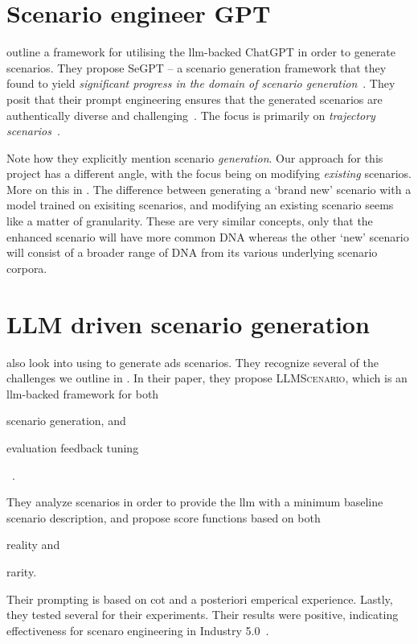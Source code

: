 \section{Scenario engineer GPT}

\citeauthor{seGpt} outline a framework for utilising the \acrshort{llm}-backed ChatGPT in order to
generate scenarios. They propose SeGPT -- a scenario generation framework that they found to yield
\textit{significant progress in the domain of scenario generation}~\cite[4422]{seGpt}. They posit
that their prompt engineering ensures that the generated scenarios are authentically diverse and
challenging~\cite[4423]{seGpt}. The focus is primarily on \textit{trajectory
  scenarios}~\cite[4422-4423]{seGpt}.

Note how they explicitly mention scenario \textit{generation}. Our approach for this project has a
different angle, with the focus being on modifying \textit{existing} scenarios. More on this in
. The difference between generating a `brand new' scenario with a model
trained on exisiting scenarios, and modifying an existing scenario seems like a matter of
granularity. These are very similar concepts, only that the enhanced scenario will have more common
DNA whereas the other `new' scenario will consist of a broader range of DNA from its various
underlying scenario corpora.

\section{LLM driven scenario generation}

\citeauthor{LLMScenarioChang24} also look into using  to generate \acrshort{ads}
scenarios. They recognize several of the challenges we outline in . In
their \citeyear{LLMScenarioChang24} paper, they propose \textsc{LLMScenario}, which is an
\acrshort{llm}-backed framework for both \begin{inparaenum}
  \item scenario generation, and
  \item  evaluation feedback tuning
\end{inparaenum}~\cite[6581]{LLMScenarioChang24}.

They analyze scenarios in order to provide the \acrshort{llm} with a minimum baseline scenario
description, and propose score functions based on both \begin{inparaenum}
  \item reality and
  \item rarity.
\end{inparaenum} Their prompting is based on \acrfull{cot} and a posteriori emperical experience.
Lastly, they tested several  for their experiments. Their results were positive,
indicating effectiveness for scenaro engineering in Industry 5.0~\cite[6581]{LLMScenarioChang24}.

